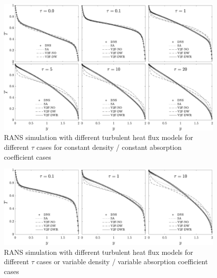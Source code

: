 \documentclass[10pt]{article}
\begin{document}
\begin{figure}[h]
\centering
\includegraphics[width=1.1\textwidth]{../solution/Figures/Tempgrey.pdf}
\caption{\noindent RANS simulation with different turbulent heat flux models for different $\tau$ cases for constant density / constant absorption coefficient cases}
\label{constk}
\end{figure}

\begin{figure}[h]
\centering
\includegraphics[width=1.1\textwidth]{../solution/Figures_r/Tempvar.pdf}
\caption{\noindent RANS simulation with different turbulent heat flux models for different $\tau$ cases or variable density / variable absorption coefficient cases}
\label{vark}
\end{figure}
\end{document}
